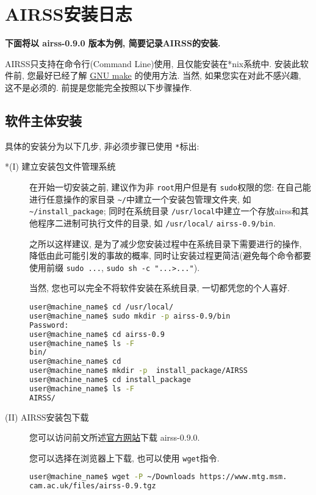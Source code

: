 \documentclass[a4paper, 10pt]{article}
\begin{document}
\newpage
\appendix
\section{AIRSS安装日志}
\label{sec:airss-install} 
\textbf{下面将以 airss-0.9.0 版本为例, 简要记录AIRSS的安装.}

AIRSS只支持在命令行(Command Line)使用, 且仅能安装在*nix系统中. 安装此软件前, 您最好已经了解 \href{https://www.gnu.org/software/make/manual/}{GNU make} 的使用方法. 当然, 如果您实在对此不感兴趣, 这不是必须的. 前提是您能完全按照以下步骤操作.

\subsection{软件主体安装}
具体的安装分为以下几步, 非必须步骤已使用 \verb|*|标出:
\begin{description}
\item [*(I) 建立安装包文件管理系统] 在开始一切安装之前, 建议作为非 \verb|root|用户但是有 \verb|sudo|权限的您: 在自己能进行任意操作的家目录 \verb|~/|中建立一个安装包管理文件夹, 如 \verb|~/install_package|; 同时在系统目录 \verb|/usr/local|中建立一个存放airss和其他程序二进制可执行文件的目录, 如 \verb|/usr/local/| \verb|airss-0.9/bin|. 

之所以这样建议, 是为了减少您安装过程中在系统目录下需要进行的操作, 降低由此可能引发的事故的概率, 同时让安装过程更简洁(避免每个命令都要使用前缀 \verb|sudo ...|, \verb|sudo sh -c "...>..."|). 

当然, 您也可以完全不将软件安装在系统目录, 一切都凭您的个人喜好.
\begin{lstlisting}[language={bash}]
user@machine_name$ cd /usr/local/
user@machine_name$ sudo mkdir -p airss-0.9/bin
Password:
user@machine_name$ cd airss-0.9
user@machine_name$ ls -F 
bin/
user@machine_name$ cd
user@machine_name$ mkdir -p  install_package/AIRSS
user@machine_name$ cd install_package
user@machine_name$ ls -F
AIRSS/
\end{lstlisting}

\item [(II) AIRSS安装包下载]您可以访问前文所述\href{https://www.mtg.msm.cam.ac.uk/Codes/AIRSS}{官方网站}下载 airss-0.9.0.

您可以选择在浏览器上下载, 也可以使用 \verb|wget|指令.

\begin{lstlisting}[language={bash}]
user@machine_name$ wget -P ~/Downloads https://www.mtg.msm.
cam.ac.uk/files/airss-0.9.tgz
\end{lstlisting}


\end{description}
\end{document}
